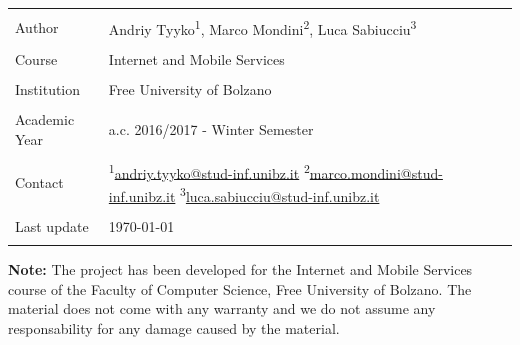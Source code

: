 \documentclass[12pt,letterpaper, onecolumn]{article}
\begin{document}
\begin{titlepage}
\begin{center}
			\begin{tabular}{p{} p{}}
				\hline \\[-1em]
				Author & Andriy Tyyko\textsuperscript{1}, Marco Mondini\textsuperscript{2}, Luca Sabiucciu\textsuperscript{3} \tabularnewline
				\hline \\[-1em]
				Course & Internet and Mobile Services \tabularnewline 
				\hline \\[-1em]
				Institution & Free University of Bolzano \tabularnewline
				\hline \\[-1em]
				Academic Year & a.c. 2016/2017 - Winter Semester \tabularnewline
				\hline \\[-1em]
				Contact &  \textsuperscript{1}\href{mailto:andriy.tyyko@stud-inf.unibz.it}{andriy.tyyko@stud-inf.unibz.it} \newline 
				\textsuperscript{2}\href{mailto:marco.mondini@stud-inf.unibz.it}{marco.mondini@stud-inf.unibz.it} \newline 
				\textsuperscript{3}\href{mailto:luca.sabiucciu@stud-inf.unibz.it}{luca.sabiucciu@stud-inf.unibz.it} \tabularnewline 
				\hline \\[-1em]
				Last update & {\today} \tabularnewline 
				\hline \\[-1em]
			\end{tabular}
		\end{center}
		\vfill
		\footnotesize
		{\bf Note:}
		\newline
		The project has been developed for the Internet and Mobile Services course of the Faculty of Computer Science, Free University of Bolzano. The material does not come with any warranty and we do not assume any responsability for any damage caused by the material.
	\end{titlepage}

	\renewcommand{\thepage}{\roman{page}}
	\thispagestyle{empty}
	\tableofcontents
	\newpage	
\end{document}
